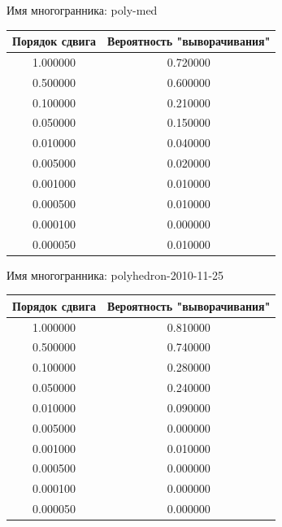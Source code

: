\documentclass[a4paper,12pt, titlepage]{article}
\begin{document}
\begin{flushleft}
Имя многогранника: poly-med\\
\begin{tabular}{|c|c|}
\hline
	Порядок сдвига & Вероятность "выворачивания"\\
\hline
	1.000000 &	0.720000\\
\hline
	0.500000 &	0.600000\\
\hline
	0.100000 &	0.210000\\
\hline
	0.050000 &	0.150000\\
\hline
	0.010000 &	0.040000\\
\hline
	0.005000 &	0.020000\\
\hline
	0.001000 &	0.010000\\
\hline
	0.000500 &	0.010000\\
\hline
	0.000100 &	0.000000\\
\hline
	0.000050 &	0.010000\\
\hline
\end{tabular}
\end{flushleft}

\begin{flushleft}
Имя многогранника: polyhedron-2010-11-25\\
\begin{tabular}{|c|c|}
\hline
	Порядок сдвига & Вероятность "выворачивания"\\
\hline
	1.000000 &	0.810000\\
\hline
	0.500000 &	0.740000\\
\hline
	0.100000 &	0.280000\\
\hline
	0.050000 &	0.240000\\
\hline
	0.010000 &	0.090000\\
\hline
	0.005000 &	0.000000\\
\hline
	0.001000 &	0.010000\\
\hline
	0.000500 &	0.000000\\
\hline
	0.000100 &	0.000000\\
\hline
	0.000050 &	0.000000\\
\hline
\end{tabular}
\end{flushleft}
\end{document}
